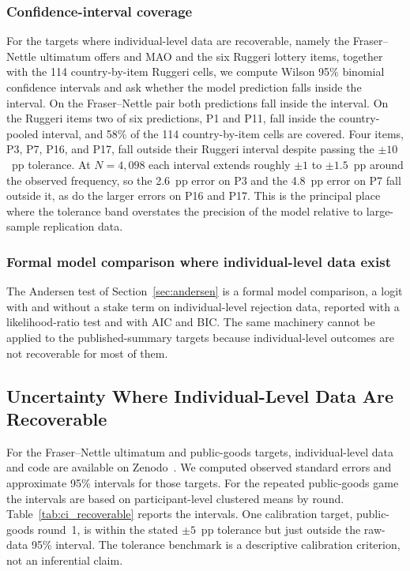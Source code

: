 \documentclass[journal]{IEEEtran}
\begin{document}
\subsubsection{Confidence-interval coverage}
For the targets where individual-level data are recoverable, namely the Fraser--Nettle ultimatum offers and MAO and the six Ruggeri lottery items, together with the 114 country-by-item Ruggeri cells, we compute Wilson 95\% binomial confidence intervals and ask whether the model prediction falls inside the interval.
On the Fraser--Nettle pair both predictions fall inside the interval.
On the Ruggeri items two of six predictions, P1 and P11, fall inside the country-pooled interval, and 58\% of the 114 country-by-item cells are covered.
Four items, P3, P7, P16, and P17, fall outside their Ruggeri interval despite passing the $\pm10$~pp tolerance.
At $N=4{,}098$ each interval extends roughly $\pm1$ to $\pm1.5$~pp around the observed frequency, so the 2.6~pp error on P3 and the 4.8~pp error on P7 fall outside it, as do the larger errors on P16 and P17.
This is the principal place where the tolerance band overstates the precision of the model relative to large-sample replication data.

\subsubsection{Formal model comparison where individual-level data exist}
The Andersen test of Section~\ref{sec:andersen} is a formal model comparison, a logit with and without a stake term on individual-level rejection data, reported with a likelihood-ratio test and with AIC and BIC.
The same machinery cannot be applied to the published-summary targets because individual-level outcomes are not recoverable for most of them.

\subsection{Uncertainty Where Individual-Level Data Are Recoverable}

For the Fraser--Nettle ultimatum and public-goods targets, individual-level data and code are available on Zenodo~\cite{fraserdata2020}.
We computed observed standard errors and approximate 95\% intervals for those targets.
For the repeated public-goods game the intervals are based on participant-level clustered means by round.
Table~\ref{tab:ci_recoverable} reports the intervals.
One calibration target, public-goods round~1, is within the stated $\pm5$~pp tolerance but just outside the raw-data 95\% interval.
The tolerance benchmark is a descriptive calibration criterion, not an inferential claim.
\end{document}
